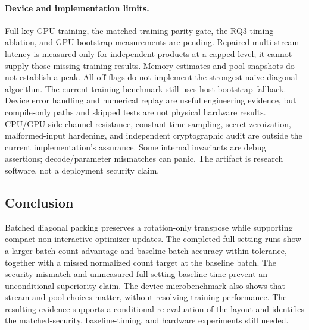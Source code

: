 \paragraph{Device and implementation limits.}
Full-key GPU training, the matched training parity gate, the RQ3 timing ablation, and GPU bootstrap measurements are pending. Repaired multi-stream latency is measured only for independent products at a capped level; it cannot supply those missing training results. Memory estimates and pool snapshots do not establish a peak. All-off flags do not implement the strongest naive diagonal algorithm. The current training benchmark still uses host bootstrap fallback. Device error handling and numerical replay are useful engineering evidence, but compile-only paths and skipped tests are not physical hardware results. CPU/GPU side-channel resistance, constant-time sampling, secret zeroization, malformed-input hardening, and independent cryptographic audit are outside the current implementation's assurance. Some internal invariants are debug assertions; decode/parameter mismatches can panic. The artifact is research software, not a deployment security claim.

\subsection{Conclusion}
Batched diagonal packing preserves a rotation-only transpose while supporting compact non-interactive optimizer updates. The completed full-setting runs show a larger-batch count advantage and baseline-batch accuracy within tolerance, together with a missed normalized count target at the baseline batch. The security mismatch and unmeasured full-setting baseline time prevent an unconditional superiority claim. The device microbenchmark also shows that stream and pool choices matter, without resolving training performance. The resulting evidence supports a conditional re-evaluation of the layout and identifies the matched-security, baseline-timing, and hardware experiments still needed.
